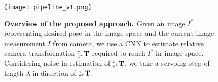 \documentclass[usletter, 10 pt, conference]{ieeeconf}  %
\begin{document}
\begin{figure}[t!]
\begin{center}
\texttt{[image: pipeline\_v1.png]}
\vspace{-1.50em}
\caption{\textbf{Overview of the proposed approach.} Given an image $I^*$ representing desired pose in the image space and the current image measurement $I$ from camera, we use a CNN to estimate relative camera transformation $_{c^*}^{c}\textrm{\textbf{T}}$ required to reach $I^*$ in image space. Considering noise in estimation of $_{c^*}^{c}\textrm{\textbf{T}}$, we take a servoing step of length $\lambda$ in direction of $_{c^*}^{c}\textrm{\textbf{T}}$. }
\label{fig:overview}
\end{center}
\vspace{-1.0em}
\end{figure}
\end{document}
